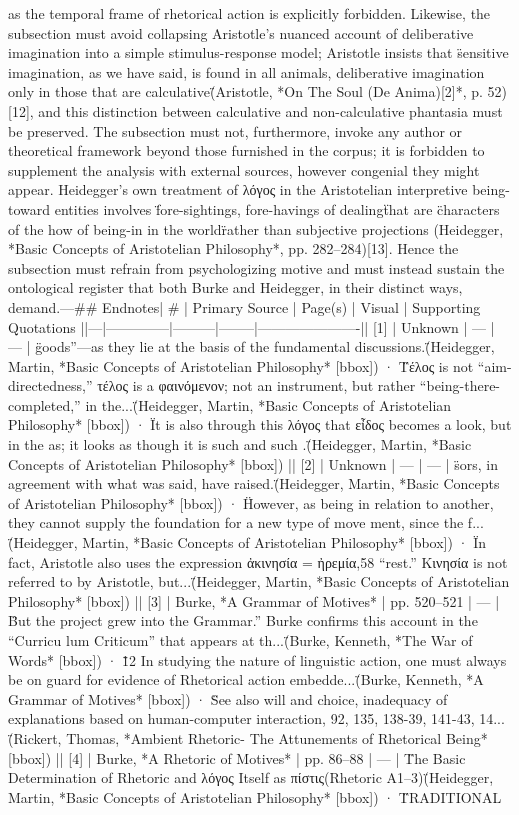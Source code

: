 {{as the temporal frame of rhetorical action is explicitly forbidden. Likewise, the subsection must avoid collapsing Aristotle's nuanced account of deliberative imagination into a simple stimulus-response model; Aristotle insists that \"sensitive imagination, as we have said, is found in all animals, deliberative imagination only in those that are calculative\" (Aristotle, *On The Soul (De Anima)[2]*, p. 52)[12], and this distinction between calculative and non-calculative phantasia must be preserved. The subsection must not, furthermore, invoke any author or theoretical framework beyond those furnished in the corpus; it is forbidden to supplement the analysis with external sources, however congenial they might appear. Heidegger's own treatment of λόγος in the Aristotelian interpretive being-toward entities involves \"fore-sightings, fore-havings of dealing\" that are \"characters of the how of being-in in the world\" rather than subjective projections (Heidegger, *Basic Concepts of Aristotelian Philosophy*, pp. 282–284)[13]. Hence the subsection must refrain from psychologizing motive and must instead sustain the ontological register that both Burke and Heidegger, in their distinct ways, demand.\n\n\n---\n\n## Endnotes\n\n| # | Primary Source | Page(s) | Visual | Supporting Quotations |\n|---|--------------|---------|--------|----------------------|\n| [1] | Unknown | — | — | \"goods”—as they lie at the basis of the fundamental discussions.\" (Heidegger, Martin, *Basic Concepts of Aristotelian Philosophy* [bbox]) · \"Τέλος is not “aim-directedness,” τέλος is a φαινόμενον; not an instrument, but rather “being-there-completed,” in the...\" (Heidegger, Martin, *Basic Concepts of Aristotelian Philosophy* [bbox]) · \"It is also through this λόγος that εἶδος becomes a look, but in the as; it looks as though it is such and such .\" (Heidegger, Martin, *Basic Concepts of Aristotelian Philosophy* [bbox]) |\n| [2] | Unknown | — | — | \"sors, in agreement with what was said, have raised.\" (Heidegger, Martin, *Basic Concepts of Aristotelian Philosophy* [bbox]) · \"However, as being in relation to another, they cannot supply the foundation for a new type of move­ ment, since the f...\" (Heidegger, Martin, *Basic Concepts of Aristotelian Philosophy* [bbox]) · \"In fact, Aristotle also uses the expression ἀκινησία = ἠρεμία,58 “rest.” Κινησία is not referred to by Aristotle, but...\" (Heidegger, Martin, *Basic Concepts of Aristotelian Philosophy* [bbox]) |\n| [3] | Burke, *A Grammar of Motives* | pp. 520–521 | — | \"But the project grew into the Grammar.” Burke confirms this account in the “Curricu­ lum Criticum” that appears at th...\" (Burke, Kenneth, *The War of Words* [bbox]) · \"12 In studying the nature of linguistic action, one must always be on guard for evidence of Rhetorical action embedde...\" (Burke, Kenneth, *A Grammar of Motives* [bbox]) · \"See also will and choice, inadequacy of explanations based on human-computer interaction, 92, 135, 138-39, 141-43, 14...\" (Rickert, Thomas, *Ambient Rhetoric- The Attunements of Rhetorical Being* [bbox]) |\n| [4] | Burke, *A Rhetoric of Motives* | pp. 86–88 | — | \"The Basic Determination of Rhetoric and λόγος Itself as πίστις\n\n(Rhetoric Α1–3)\" (Heidegger, Martin, *Basic Concepts of Aristotelian Philosophy* [bbox]) · \"TRADITIONAL }}
